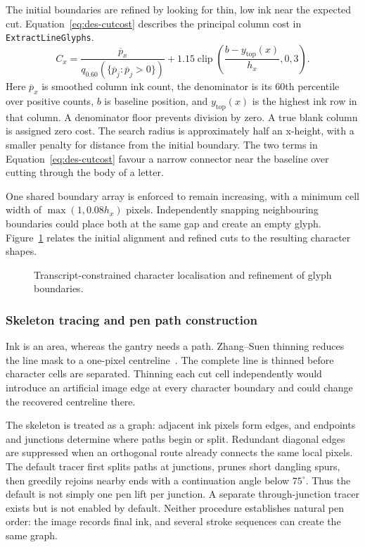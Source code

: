 The initial boundaries are refined by looking for thin, low ink near the expected cut. Equation~\ref{eq:des-cutcost} describes the principal column cost in \texttt{ExtractLineGlyphs}.
\begin{equation}
C_x=\frac{\overline p_x}{q_{0.60}(\{\overline p_j:\overline p_j>0\})}
+1.15\operatorname{clip}\left(\frac{b-y_{\mathrm{top}}(x)}{h_x},0,3\right).
\label{eq:des-cutcost}
\end{equation}
Here $\overline p_x$ is smoothed column ink count, the denominator is its 60th percentile over positive counts, $b$ is baseline position, and $y_{\mathrm{top}}(x)$ is the highest ink row in that column. A denominator floor prevents division by zero. A true blank column is assigned zero cost. The search radius is approximately half an x-height, with a smaller penalty for distance from the initial boundary. The two terms in Equation~\ref{eq:des-cutcost} favour a narrow connector near the baseline over cutting through the body of a letter.

One shared boundary array is enforced to remain increasing, with a minimum cell width of $\max(1,0.08h_x)$ pixels. Independently snapping neighbouring boundaries could place both at the same gap and create an empty glyph. Figure~\ref{fig:des-alignment} relates the initial alignment and refined cuts to the resulting character shapes.
\begin{figure}[!htbp]\centering
{}
\caption{Transcript-constrained character localisation and refinement of glyph boundaries.}
\label{fig:des-alignment}
\end{figure}

\subsubsection{Skeleton tracing and pen path construction}
Ink is an area, whereas the gantry needs a path. Zhang--Suen thinning reduces the line mask to a one-pixel centreline~\cite[p.~237]{zhang1984}. The complete line is thinned before character cells are separated. Thinning each cut cell independently would introduce an artificial image edge at every character boundary and could change the recovered centreline there.

The skeleton is treated as a graph: adjacent ink pixels form edges, and endpoints and junctions determine where paths begin or split. Redundant diagonal edges are suppressed when an orthogonal route already connects the same local pixels. The default tracer first splits paths at junctions, prunes short dangling spurs, then greedily rejoins nearby ends with a continuation angle below $75^\circ$. Thus the default is not simply one pen lift per junction. A separate through-junction tracer exists but is not enabled by default. Neither procedure establishes natural pen order: the image records final ink, and several stroke sequences can create the same graph.


